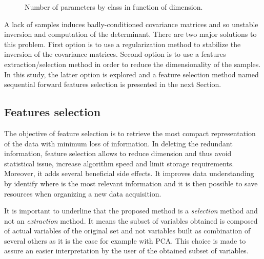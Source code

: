 \documentclass[journal,peerreview,onecolumn]{IEEEtran}
\begin{document}
    \begin{figure}[!t]
        \centering
        \caption{Number of parameters by class in function of dimension.\label{fig:nb-param}}
    \end{figure}

    A lack of samples induces badly-conditioned covariance matrices and so unstable inversion and computation of the determinant. There are two major solutions to this problem. First option is to use a regularization method to stabilize the inversion of the covariance matrices\cite{hoerl1970ridge}. Second option is to use a features extraction/selection method in order to reduce the dimensionality of the samples. In this study, the latter option is explored and a feature selection method named sequential forward features selection is presented in the next Section.

    \subsection{Features selection}
    \label{sec:selection}

    The objective of feature selection is to retrieve the most compact representation of the data with minimum loss of information. In deleting the redundant information, feature selection allows to reduce dimension and thus avoid statistical issue, increase algorithm speed and limit storage requirements. Moreover, it adds several beneficial side effects. It improves data understanding by identify where is the most relevant information and it is then possible to save resources when organizing a new data acquisition.

    It is important to underline that the proposed method is a \emph{selection} method and not an \emph{extraction} method. It means the subset of variables obtained is composed of actual variables of the original set and not variables built as combination of several others as it is the case for example with PCA. This choice is made to assure an easier interpretation by the user of the obtained subset of variables.
\end{document}
